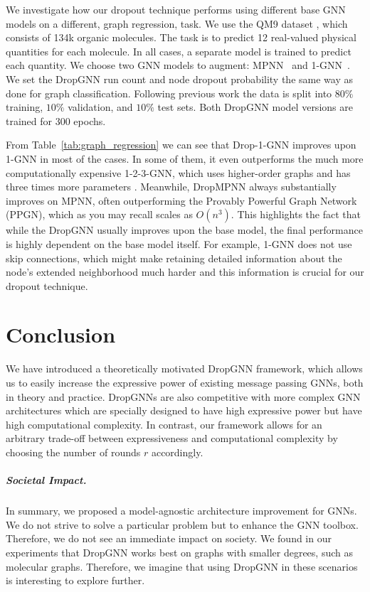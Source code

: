 \documentclass{article}
\begin{document}
We investigate how our dropout technique performs using different base GNN models on a different, graph regression, task. We use the QM9 dataset \citep{ramakrishnan2014quantum}, which consists of 134k organic molecules. The task is to predict 12 real-valued physical quantities for each molecule. In all cases, a separate model is trained to predict each quantity. We choose two GNN models to augment: MPNN~\citep{gilmer2017neural} and 1-GNN~\citep{morris2019weisfeiler}.
We set the DropGNN run count and node dropout probability the same way as done for graph classification. Following previous work \citep{morris2019weisfeiler, maron2019provably} the data is split into $80\%$ training, $10\%$ validation, and $10\%$ test sets. Both DropGNN model versions are trained for 300 epochs.

From Table~\ref{tab:graph_regression} we can see that Drop-1-GNN improves upon 1-GNN in most of the cases. In some of them, it even outperforms the much more computationally expensive 1-2-3-GNN, which uses higher-order graphs and has three times more parameters \citep{morris2019weisfeiler}. Meanwhile, DropMPNN always substantially improves on MPNN, often outperforming the Provably Powerful Graph Network (PPGN), which as you may recall scales as $O(n^3)$. This highlights the fact that while the DropGNN usually improves upon the base model, the final performance is highly dependent on the base model itself. For example, 1-GNN does not use skip connections, which might make retaining detailed information about the node's extended neighborhood much harder and this information is crucial for our dropout technique. 


\section{Conclusion}\label{sec:conclusion}

We have introduced a theoretically motivated DropGNN framework, which allows us to easily increase the expressive power of existing message passing GNNs, both in theory and practice. 
DropGNNs are also competitive with more complex GNN architectures which are specially designed to have high expressive power but have high computational complexity. In contrast, our framework allows for an arbitrary trade-off between expressiveness and computational complexity by choosing the number of rounds $r$ accordingly.


\subparagraph{Societal Impact.}
In summary, we proposed a model-agnostic architecture improvement for GNNs. We do not strive to solve a particular problem but to enhance the GNN toolbox. Therefore, we do not see an immediate impact on society. We found in our experiments that DropGNN works best on graphs with smaller degrees, such as molecular graphs. Therefore, we imagine that using DropGNN in these scenarios is interesting to explore further.
\end{document}
